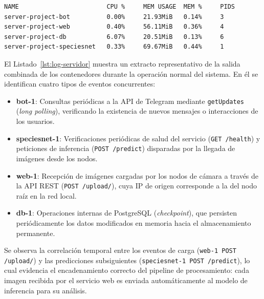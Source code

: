 \documentclass[a4paper, 12pt]{report}
\begin{document}
\begin{lstlisting}[caption={Estadísticas de contenedores Docker corriendo.}, label=lst:docker-stats, numbers=none, emphstyle=\bfseries, basicstyle=\ttfamily]
NAME                        CPU %     MEM USAGE  MEM %     PIDS
server-project-bot          0.00%     21.93MiB   0.14%     3
server-project-web          0.40%     56.11MiB   0.36%     4
server-project-db           6.07%     20.51MiB   0.13%     6
server-project-speciesnet   0.33%     69.67MiB   0.44%     1
\end{lstlisting}

El Listado~\ref{lst:log-servidor} muestra un extracto representativo de la salida combinada de los contenedores durante la operación normal del sistema. En él se identifican cuatro tipos de eventos concurrentes:

\begin{itemize}
  \item \textbf{bot-1}: Consultas periódicas a la API de Telegram mediante \texttt{getUpdates} (\textit{long polling}), verificando la existencia de nuevos mensajes o interacciones de los usuarios.
  \item \textbf{speciesnet-1}: Verificaciones periódicas de salud del servicio (\texttt{GET /health}) y peticiones de inferencia (\texttt{POST /predict}) disparadas por la llegada de imágenes desde los nodos.
  \item \textbf{web-1}: Recepción de imágenes cargadas por los nodos de cámara a través de la API REST (\texttt{POST /upload/}), cuya IP de origen corresponde a la del nodo raíz en la red local.
  \item \textbf{db-1}: Operaciones internas de PostgreSQL (\textit{checkpoint}), que persisten periódicamente los datos modificados en memoria hacia el almacenamiento permanente.
\end{itemize}

Se observa la correlación temporal entre los eventos de carga (\texttt{web-1 POST /upload/}) y las predicciones subsiguientes (\texttt{speciesnet-1 POST /predict}), lo cual evidencia el encadenamiento correcto del pipeline de procesamiento: cada imagen recibida por el servicio web es enviada automáticamente al modelo de inferencia para su análisis.
\end{document}
